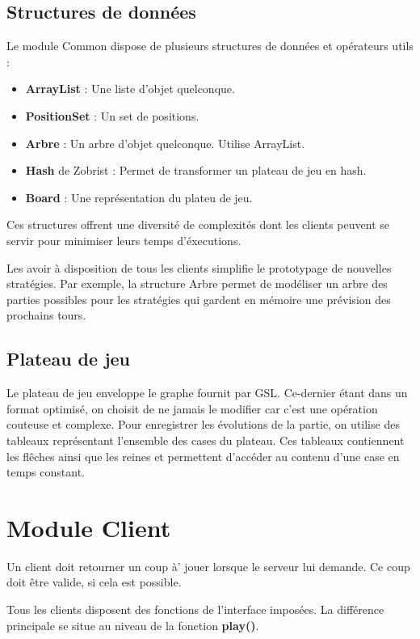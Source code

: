 \documentclass{article}
\begin{document}
\subsection{Structures de donn\'ees}
Le module Common dispose de plusieurs structures de donn\'ees et op\'erateurs utils :
\begin{itemize}
    \item \textbf{ArrayList} : Une liste d'objet quelconque.
    \item \textbf{PositionSet} : Un set de positions.
    \item \textbf{Arbre} : Un arbre d'objet quelconque. Utilise ArrayList.
    \item \textbf{Hash} de Zobrist : Permet de transformer un plateau de jeu en hash.
    \item \textbf{Board} : Une repr\'esentation du plateu de jeu.
\end{itemize}

Ces structures offrent une diversit\'e de complexit\'es dont les clients 
peuvent se servir pour minimiser leurs temps d'\'executions.

Les avoir \`a disposition de tous les clients simplifie le prototypage de nouvelles strat\'egies.
Par exemple, la structure Arbre permet de mod\'eliser un arbre des parties possibles pour les 
strat\'egies qui gardent en m\'emoire une pr\'evision des prochains tours.

\subsection{Plateau de jeu}
Le plateau de jeu enveloppe le graphe fournit par GSL.
Ce-dernier \'etant dans un format optimis\'e, on choisit de ne jamais 
le modifier car c'est une op\'eration couteuse et complexe. Pour 
enregistrer les \'evolutions de la partie, on utilise des 
tableaux repr\'esentant l'ensemble des cases du plateau.
Ces tableaux contiennent les fl\^eches ainsi que les reines 
et permettent d'acc\'eder au contenu d'une case en temps constant.


\section{Module Client}
Un client doit retourner un coup \`a' jouer lorsque le serveur lui demande.
Ce coup doit \^etre valide, si cela est possible.

Tous les clients disposent des fonctions de l'interface impos\'ees.
La diff\'erence principale se situe au niveau de la fonction \textbf{play()}.
\end{document}
